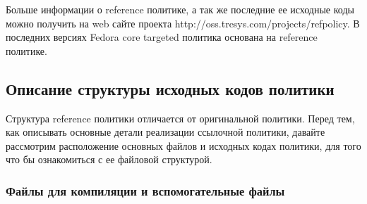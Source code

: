\documentclass{./../class/UIR}
\begin{document}
	
	Больше информации о reference политике, а так же последние ее исходные коды
	можно получить на web сайте проекта http://oss.tresys.com/projects/refpolicy. 
	В последних версиях Fedora core targeted политика основана на reference политике. 
	
\subsection{Описание структуры исходных кодов политики}
	
	Структура reference политики отличается от оригинальной политики. Перед тем,
	как описывать основные детали реализации ссылочной политики, давайте рассмотрим 
	расположение основных файлов и исходных кодах политики, для того что бы 
	ознакомиться с ее файловой структурой.
	
	\subsubsection{Файлы для компиляции и вспомогательные файлы}
	
\end{document}
